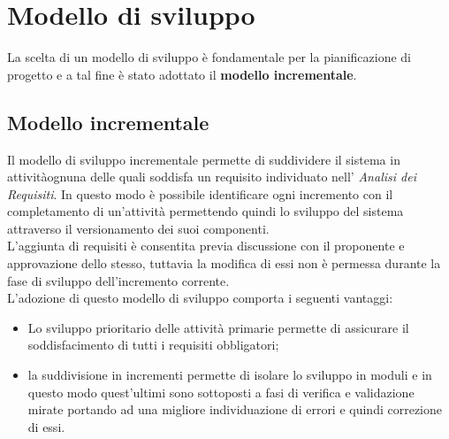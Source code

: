 \section{Modello di sviluppo}
La scelta di un modello di sviluppo è fondamentale per la pianificazione di 
progetto e a tal fine è stato adottato il \textbf{modello incrementale}.

\subsection{Modello incrementale}
Il modello di sviluppo incrementale permette di suddividere il sistema in 
attività\glosp ognuna delle quali soddisfa un requisito\glosp 
individuato nell' \textit{Analisi dei Requisiti}. In questo modo è possibile 
identificare ogni incremento con il completamento di un'attività permettendo 
quindi lo sviluppo del sistema attraverso il versionamento dei suoi componenti. 
\\
L'aggiunta di requisiti è consentita previa discussione con il proponente e 
approvazione dello stesso, tuttavia la modifica di essi non è permessa 
durante la fase di sviluppo dell'incremento corrente.\\
L'adozione di questo modello di sviluppo comporta i seguenti vantaggi:
\begin{itemize}
	\item Lo sviluppo prioritario delle attività primarie permette di 
	assicurare il soddisfacimento di tutti i requisiti obbligatori;
	\item la suddivisione in incrementi permette di isolare lo sviluppo in 
	moduli e in questo modo quest'ultimi sono sottoposti a fasi di verifica e 
	validazione mirate portando ad una migliore individuazione di errori e 
	quindi correzione di essi.
\end{itemize}

